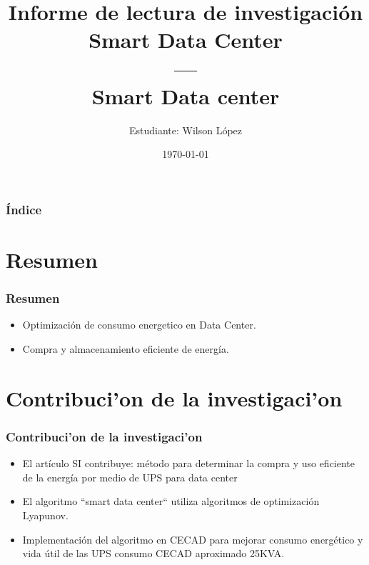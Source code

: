 \documentclass[11pt]{beamer}					%
\title{Informe de lectura de investigación Smart Data Center \\ --- \\ Smart Data center}
\author{Estudiante: Wilson López}
\institute[UD]{Universidad Distrital Francisco José de Caldas}
\date{\today}
\begin{document}
	
	
\begin{frame}[fragile]							%
		\titlepage 
	
\end{frame}	

	\begin{frame}[fragile]							%
		\frametitle{Índice}	
		\tableofcontents
\end{frame}	



\section{Resumen}
\begin{frame}[fragile]						%
	\frametitle{Resumen}	
	\begin{block}{}
		\begin{itemize}
			\item Optimización de consumo energetico en Data Center.
			
			
			\item Compra y almacenamiento eficiente de energía.
		\end{itemize}
	\end{block}

	  	
				

		

\end{frame}		

\section{Contribuci'on de la investigaci'on}
\begin{frame}[fragile]						%
	\frametitle{Contribuci'on de la investigaci'on}					
	\begin{center}
	\begin{itemize}
		\item El artículo SI contribuye:  método para determinar la compra y uso eficiente de la energía por medio de UPS para data center\\
		
		\item El algoritmo  “smart data center“ utiliza algoritmos de optimización Lyapunov. 
		
		\item Implementación del algoritmo en CECAD para mejorar consumo energético y vida útil de las UPS consumo CECAD aproximado 25KVA. 	
		
	\end{itemize}
	\end{center}
\end{frame}	
\end{document}
